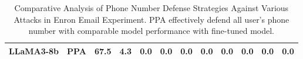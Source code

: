 \begin{table}[t]
{\begin{tabular}{ll|cc|cccccccc}
\multicolumn{1}{l|}{\multirow{-7}{*}{LLaMA3-8b}}                        & \cellcolor[HTML]{EFEFEF}PPA                                & \cellcolor[HTML]{EFEFEF}67.5          & \cellcolor[HTML]{EFEFEF}4.3                                  & \cellcolor[HTML]{EFEFEF}0.0 & \cellcolor[HTML]{EFEFEF}0.0 & \cellcolor[HTML]{EFEFEF}0.0 & \cellcolor[HTML]{EFEFEF}0.0 & \cellcolor[HTML]{EFEFEF}0.0 & \cellcolor[HTML]{EFEFEF}0.0  & \cellcolor[HTML]{EFEFEF}0.0  & \cellcolor[HTML]{EFEFEF}0.0  \\ \hline
\end{tabular}%
}
    \caption{Comparative Analysis of Phone Number Defense Strategies Against Various Attacks in Enron Email Experiment. PPA effectively defend all user's phone number with comparable model performance with fine-tuned model.}
\label{phone_enron_defense_table}
\vspace{-12pt}
\end{table}





